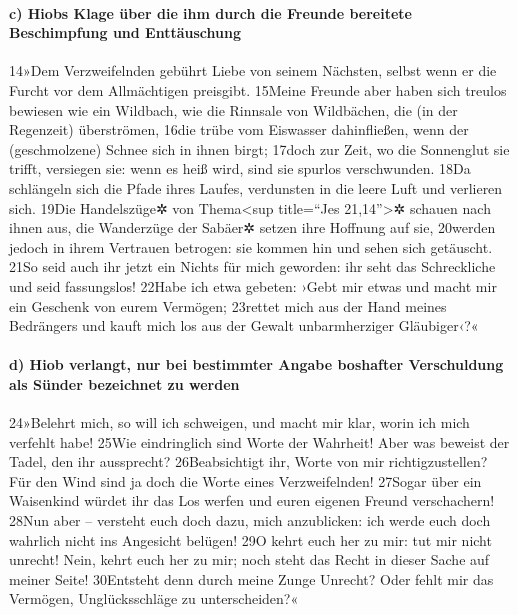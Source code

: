 \hypertarget{c-hiobs-klage-uxfcber-die-ihm-durch-die-freunde-bereitete-beschimpfung-und-enttuxe4uschung}{%
\paragraph{c) Hiobs Klage über die ihm durch die Freunde bereitete
Beschimpfung und
Enttäuschung}\label{c-hiobs-klage-uxfcber-die-ihm-durch-die-freunde-bereitete-beschimpfung-und-enttuxe4uschung}}

14»Dem Verzweifelnden gebührt Liebe von seinem Nächsten, selbst wenn er
die Furcht vor dem Allmächtigen preisgibt. 15Meine Freunde aber haben
sich treulos bewiesen wie ein Wildbach, wie die Rinnsale von Wildbächen,
die (in der Regenzeit) überströmen, 16die trübe vom Eiswasser
dahinfließen, wenn der (geschmolzene) Schnee sich in ihnen birgt; 17doch
zur Zeit, wo die Sonnenglut sie trifft, versiegen sie: wenn es heiß
wird, sind sie spurlos verschwunden. 18Da schlängeln sich die Pfade
ihres Laufes, verdunsten in die leere Luft und verlieren sich. 19Die
Handelszüge✲ von Thema\textless sup title=``Jes 21,14''\textgreater✲
schauen nach ihnen aus, die Wanderzüge der Sabäer✲ setzen ihre Hoffnung
auf sie, 20werden jedoch in ihrem Vertrauen betrogen: sie kommen hin und
sehen sich getäuscht. 21So seid auch ihr jetzt ein Nichts für mich
geworden: ihr seht das Schreckliche und seid fassungslos! 22Habe ich
etwa gebeten: ›Gebt mir etwas und macht mir ein Geschenk von eurem
Vermögen; 23rettet mich aus der Hand meines Bedrängers und kauft mich
los aus der Gewalt unbarmherziger Gläubiger‹?«

\hypertarget{d-hiob-verlangt-nur-bei-bestimmter-angabe-boshafter-verschuldung-als-suxfcnder-bezeichnet-zu-werden}{%
\paragraph{d) Hiob verlangt, nur bei bestimmter Angabe boshafter
Verschuldung als Sünder bezeichnet zu
werden}\label{d-hiob-verlangt-nur-bei-bestimmter-angabe-boshafter-verschuldung-als-suxfcnder-bezeichnet-zu-werden}}

24»Belehrt mich, so will ich schweigen, und macht mir klar, worin ich
mich verfehlt habe! 25Wie eindringlich sind Worte der Wahrheit! Aber was
beweist der Tadel, den ihr aussprecht? 26Beabsichtigt ihr, Worte von mir
richtigzustellen? Für den Wind sind ja doch die Worte eines
Verzweifelnden! 27Sogar über ein Waisenkind würdet ihr das Los werfen
und euren eigenen Freund verschachern! 28Nun aber -- versteht euch doch
dazu, mich anzublicken: ich werde euch doch wahrlich nicht ins Angesicht
belügen! 29O kehrt euch her zu mir: tut mir nicht unrecht! Nein, kehrt
euch her zu mir; noch steht das Recht in dieser Sache auf meiner Seite!
30Entsteht denn durch meine Zunge Unrecht? Oder fehlt mir das Vermögen,
Unglücksschläge zu unterscheiden?«


